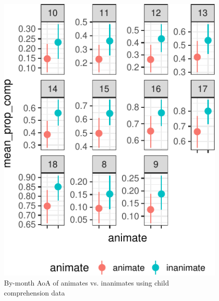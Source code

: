 \documentclass[10pt, letterpaper]{article}
\newenvironment{CodeChunk}{}{}
\begin{document}
\begin{CodeChunk}
\begin{figure}[tb]
\includegraphics{figs/animacy-aoa-comp-1} \caption[By-month AoA of animates vs]{By-month AoA of animates vs. inanimates using child comprehension data}\label{fig:animacy-aoa-comp}
\end{figure}
\end{CodeChunk}
\end{document}
